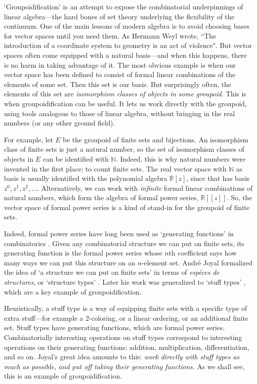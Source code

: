 \documentclass{article}
\newcommand{\R}{{\mathbb R}}
\newcommand{\N}{{\mathbb N}}
\begin{document}
`Groupoidification' is an attempt to expose the combinatorial
underpinnings of linear algebra---the hard bones of set theory
underlying the flexibility of the continuum.  One of the main lessons
of modern algebra is to avoid choosing bases for vector spaces until
you need them.  As Hermann Weyl wrote, ``The introduction of a
coordinate system to geometry is an act of violence".  But vector
spaces often come equipped with a natural basis---and when this
happens, there is no harm in taking advantage of it.  The most obvious
example is when our vector space has been defined to consist of formal
linear combinations of the elements of some set.  Then this set is our
basis.  But surprisingly often, the elements of this set are {\it
isomorphism classes of objects in some groupoid}.  This is when
groupoidification can be useful.  It lets us work directly with the
groupoid, using tools analogous to those of linear algebra, without
bringing in the real numbers (or any other ground field).

For example, let $E$ be the groupoid of finite sets and bijections.
An isomorphism class of finite sets is just a natural number, so the
set of isomorphism classes of objects in $E$ can be identified with
$\N$.  Indeed, this is why natural numbers were invented in the first
place: to count finite sets.  The real vector space with $\N$ as basis
is usually identified with the polynomial algebra $\R[z]$, since that
has basis $z^0, z^1, z^2, \dots.$ Alternatively, we can work with {\it
infinite} formal linear combinations of natural numbers, which form
the algebra of formal power series, $\R[[z]]$.  So, the vector space
of formal power series is a kind of stand-in for the groupoid of
finite sets.

Indeed, formal power series have long been used as `generating
functions' in combinatorics \cite{Wilf}.  Given any combinatorial
structure we can put on finite sets, its generating function is the
formal power series whose $n$th coefficient says how many ways we can
put this structure on an $n$-element set.  Andr\'e Joyal formalized
the idea of `a structure we can put on finite sets' in terms of {\it
esp\`eces de structures}, or `structure types' \cite{BLL,Joyal,
Joyal2}.  Later his work was generalized to `stuff types'
\cite{BaezDolan:2001}, which are a key example of groupoidification.

Heuristically, a stuff type is a way of equipping finite sets with a
specific type of extra stuff---for example a 2-coloring, or a linear
ordering, or an additional finite set.  Stuff types have generating
functions, which are formal power series.  Combinatorially interesting
operations on stuff types correspond to interesting operations on their
generating functions: addition, multiplication, differentiation, and
so on.  Joyal's great idea amounts to this: {\it work directly with
stuff types as much as possible, and put off taking their generating
functions.}  As we shall see, this is an example of groupoidification.
\end{document}
